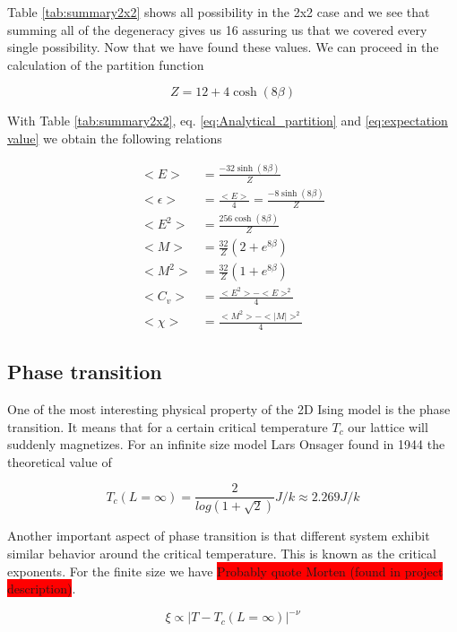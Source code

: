 \documentclass[english,notitlepage,reprint,nofootinbib]{revtex4-2}  %
\begin{document}
	Table \ref{tab:summary2x2} shows all possibility in the 2x2 case and we see that summing all
	of the degeneracy gives us 16 assuring us that we covered every single possibility. Now that
	we have found these values. We can proceed in the calculation of the partition function
	
	\begin{equation}
		Z = 12 + 4\cosh(8\beta) \label{eq:Analytical_partition} 
	\end{equation}	

	
	With Table \ref{tab:summary2x2}, eq. \ref{eq:Analytical_partition} and \ref{eq:expectation value} we obtain the following relations 
	
	\begin{align*} \label{eq:sol}
		<E> &= \frac{-32\sinh(8\beta)}{Z}  \\
		<\epsilon> &= \frac{<E>}{4} = \frac{-8\sinh(8\beta)}{Z} \\
		<E^2> &= \frac{256 \cosh(8\beta)}{Z} \\
		<M> &= \frac{32}{Z} (2 + e^{8\beta}) \\
		<M^2> &= \frac{32}{Z} (1 + e^{8\beta}) \\
		<C_v> &= \frac{<E^2> - <E>^2}{4} \\
		<\chi> &=  \frac{<M^2> - <|M|>^2}{4}
	\end{align*}
	
	
	\subsection{Phase transition}
	One of the most interesting physical property of the 2D Ising model is the phase transition.
	It means that for a certain critical temperature $T_c$ our lattice will suddenly magnetizes. For an infinite size model Lars Onsager found in 1944 the theoretical value of 
	
	\begin{equation}
		T_c(L=\infty)=\frac{2}{log(1 + \sqrt{2})} J/k \approx 2.269 J/k \label{Tc_theo}
	\end{equation}
	
	Another important aspect of phase transition is that different system exhibit similar 
	behavior around the critical temperature. This is known as the critical exponents. For the 
	finite size we have \colorbox{red}{Probably quote Morten (found in project description)}. 
	
	\begin{equation}
		\xi \propto |T - T_c(L=\infty)|^{-\nu} \label{eq:critical exponent}
	\end{equation}
	
\end{document}
